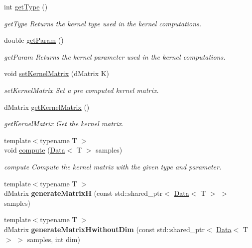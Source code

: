 \begin{DoxyCompactItemize}
int \hyperlink{class_kernel_a5a2cb0fce0eda6c67a2325f6c8958da8}{get\+Type} ()
\begin{DoxyCompactList}\small\item\em get\+Type Returns the kernel type used in the kernel computations. \end{DoxyCompactList}\item 
double \hyperlink{class_kernel_a838e2cc5018fa702e59c52a3bf8ef813}{get\+Param} ()
\begin{DoxyCompactList}\small\item\em get\+Param Returns the kernel parameter used in the kernel computations. \end{DoxyCompactList}\item 
void \hyperlink{class_kernel_a3801cee0d86f25f1500d202f43a84b65}{set\+Kernel\+Matrix} (d\+Matrix K)
\begin{DoxyCompactList}\small\item\em set\+Kernel\+Matrix Set a pre computed kernel matrix. \end{DoxyCompactList}\item 
d\+Matrix \hyperlink{class_kernel_a5e398c63fee5f0e30b6dfb735c75e41a}{get\+Kernel\+Matrix} ()
\begin{DoxyCompactList}\small\item\em get\+Kernel\+Matrix Get the kernel matrix. \end{DoxyCompactList}\item 
{\footnotesize template$<$typename T $>$ }\\void \hyperlink{class_kernel_ab6d87a5acc63347bf7e1a40ac4abf03f}{compute} (\hyperlink{class_data}{Data}$<$ T $>$ samples)
\begin{DoxyCompactList}\small\item\em compute Compute the kernel matrix with the given type and parameter. \end{DoxyCompactList}\item 
\mbox{\label{class_kernel_a3c4abf76959117a2bed74fc634f75cc5}} 
{\footnotesize template$<$typename T $>$ }\\d\+Matrix {\bfseries generate\+MatrixH} (const std\+::shared\+\_\+ptr$<$ \hyperlink{class_data}{Data}$<$ T $>$ $>$ samples)
\item 
\mbox{\label{class_kernel_a61cf016246470cc59c73a9771c1b06ac}} 
{\footnotesize template$<$typename T $>$ }\\d\+Matrix {\bfseries generate\+Matrix\+Hwithout\+Dim} (const std\+::shared\+\_\+ptr$<$ \hyperlink{class_data}{Data}$<$ T $>$ $>$ samples, int dim)

\end{DoxyCompactItemize}
